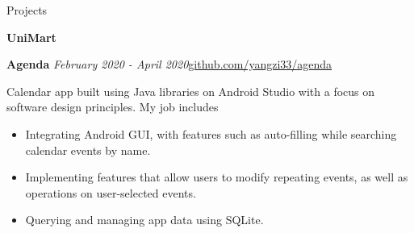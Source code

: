 \documentclass{resume} %
\begin{document}
\begin{rSection}{Projects}
\begin{rSubsection}
{\bf UniMart}
\end{rSubsection}
\begin{rSubsection}
{\bf Agenda }{\it February 2020 - April 2020}{\href{https://github.com/yangzi33/agenda}{github.com/yangzi33/agenda}}{}
\item
Calendar app built using Java libraries on Android Studio with a focus on software design principles. My job includes
\begin{itemize}
    \item Integrating Android GUI, with features such as 
    auto-filling while searching calendar events by name.
    \item Implementing features that allow users to modify
    repeating events, as well as operations on user-selected events.
    \item Querying and managing app data using SQLite.
\end{itemize}
\end{rSubsection}


\end{rSection}
\end{document}
